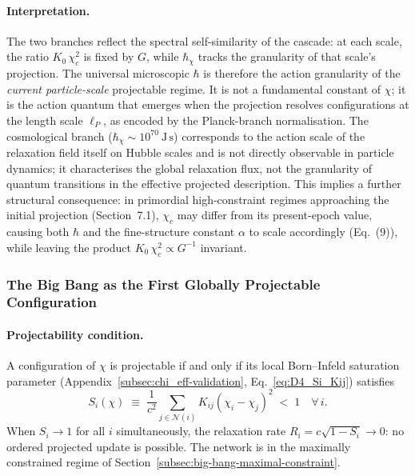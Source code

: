     \paragraph{Interpretation.}
      The two branches reflect the spectral self-similarity of the cascade:
      at each scale, the ratio $K_0\,\chi_c^2$ is fixed by $G$, while
      $\hbar_\chi$ tracks the granularity of that scale's projection.
      The universal microscopic $\hbar$ is therefore the action granularity
      of the \emph{current particle-scale} projectable regime.
      It is not a fundamental constant of $\chi$; it is the action quantum
      that emerges when the projection resolves configurations at the
      length scale $\ell_P$, as encoded by the Planck-branch normalisation.
      The cosmological branch ($\hbar_\chi \sim 10^{70}~\mathrm{J\,s}$)
      corresponds to the action scale of the relaxation field itself on
      Hubble scales and is not directly observable in particle dynamics;
      it characterises the global relaxation flux, not the granularity of
      quantum transitions in the effective projected description.
      This implies a further structural consequence: in primordial
      high-constraint regimes approaching the initial projection
      (Section~7.1), $\chi_c$ may differ from its present-epoch value,
      causing both $\hbar$ and the fine-structure constant $\alpha$ to scale
      accordingly (Eq.~(9)), while leaving the product $K_0\,\chi_c^2 \propto G^{-1}$ invariant.

  \subsubsection*{The Big Bang as the First Globally Projectable Configuration}
    \label{sec:relax-cascade-bigbang}

    \paragraph{Projectability condition.}
      A configuration of $\chi$ is projectable if and only if its local Born--Infeld saturation parameter
      (Appendix~\ref{subsec:chi_eff-validation}, Eq.~\eqref{eq:D4_Si_Kij})
      satisfies
    \begin{equation}
      \label{eq:rc-proj-cond}
      S_i(\chi) \;\equiv\;
      \frac{1}{c^2}\sum_{j \in \mathcal{N}(i)} K_{ij}(\chi_i - \chi_j)^2
      \;<\; 1
      \quad \forall\, i.
      \end{equation}
      When $S_i \to 1$ for all $i$ simultaneously, the relaxation rate
      $R_i = c\sqrt{1-S_i} \to 0$: no ordered projected update is possible.
      The network is in the maximally constrained regime of Section~\ref{subsec:big-bang-maximal-constraint}.

